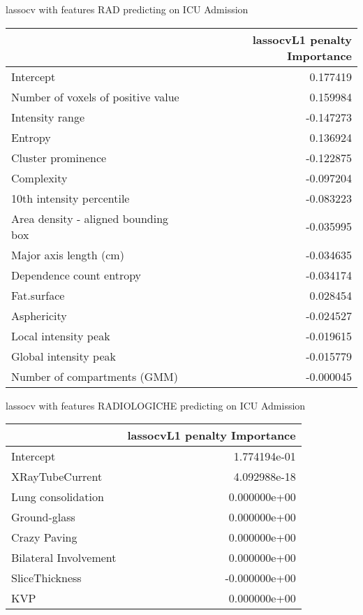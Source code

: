 {lassocv with features RAD predicting on ICU Admission

\begin{tabular}{lr}
\toprule
{} &  lassocvL1 penalty Importance \\
\midrule
Intercept                           &                      0.177419 \\
Number of voxels of positive value  &                      0.159984 \\
Intensity range                     &                     -0.147273 \\
Entropy                             &                      0.136924 \\
Cluster prominence                  &                     -0.122875 \\
Complexity                          &                     -0.097204 \\
10th intensity percentile           &                     -0.083223 \\
Area density - aligned bounding box &                     -0.035995 \\
Major axis length (cm)              &                     -0.034635 \\
Dependence count entropy            &                     -0.034174 \\
Fat.surface                         &                      0.028454 \\
Asphericity                         &                     -0.024527 \\
Local intensity peak                &                     -0.019615 \\
Global intensity peak               &                     -0.015779 \\
Number of compartments (GMM)        &                     -0.000045 \\
\bottomrule
\end{tabular}

lassocv with features RADIOLOGICHE predicting on ICU Admission

\begin{tabular}{lr}
\toprule
{} &  lassocvL1 penalty Importance \\
\midrule
Intercept             &                  1.774194e-01 \\
XRayTubeCurrent       &                  4.092988e-18 \\
Lung consolidation    &                  0.000000e+00 \\
Ground-glass          &                  0.000000e+00 \\
Crazy Paving          &                  0.000000e+00 \\
Bilateral Involvement &                  0.000000e+00 \\
SliceThickness        &                 -0.000000e+00 \\
KVP                   &                  0.000000e+00 \\
\bottomrule
\end{tabular}

}
